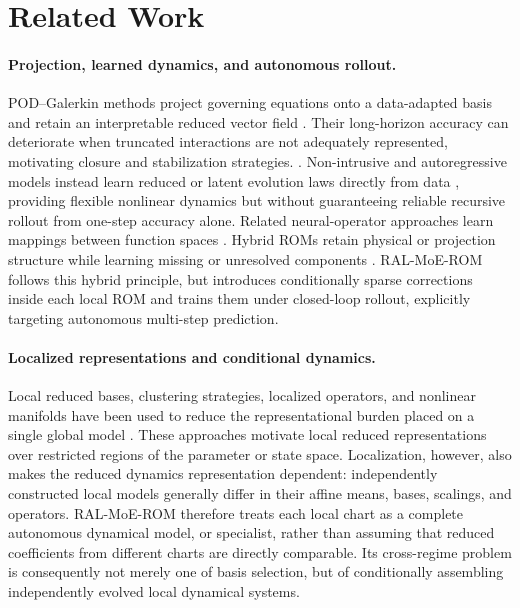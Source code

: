 \section{Related Work}

\paragraph{Projection, learned dynamics, and autonomous rollout.}
POD--Galerkin methods project governing equations onto a data-adapted basis and retain an interpretable reduced vector field \citep{sirovich1987,berkooz1993,benner2015}. Their long-horizon accuracy can deteriorate when truncated interactions are not adequately represented, motivating closure and stabilization strategies. \citep{amsallem2012}. Non-intrusive and autoregressive models instead learn reduced or latent evolution laws directly from data \citep{hesthaven2018,lee2020,champion2019,park2024,pathak2018,vlachas2018}, providing flexible nonlinear dynamics but without guaranteeing reliable recursive rollout from one-step accuracy alone. Related neural-operator approaches learn mappings between function spaces \citep{lu2021,kovachki2023}. Hybrid ROMs retain physical or projection structure while learning missing or unresolved components \citep{duraisamy2019,brunton2020,dar2023,fresca2022,geelen2023}.
RAL-MoE-ROM follows this hybrid principle, but introduces conditionally sparse corrections inside each local ROM and trains them under closed-loop rollout, explicitly targeting autonomous multi-step prediction.


\paragraph{Localized representations and conditional dynamics.}
Local reduced bases, clustering strategies, localized operators, and nonlinear manifolds have been used to reduce the representational burden placed on a single global model \citep{amsallem2008,peherstorfer2014,kaiser2014,li2021cluster,diaz2024}. These approaches motivate local reduced representations over restricted regions of the parameter or state space. Localization, however, also makes the reduced dynamics representation dependent: independently constructed local models generally differ in their affine means, bases, scalings, and operators. RAL-MoE-ROM therefore treats each local chart as a complete autonomous dynamical model, or specialist, rather than assuming that reduced coefficients from different charts are directly comparable. Its cross-regime problem is consequently not merely one of basis selection, but of conditionally assembling independently evolved local dynamical systems.

